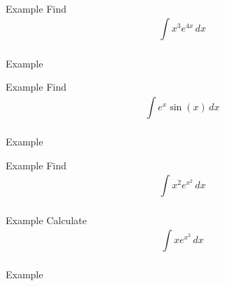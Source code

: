 \documentclass[presentation]{beamer}
\begin{document}
\begin{frame}[label={sec:org5c3f5e0}]{Example}
Find
\[
\int\limits_{}^{} x^3 e^{4x}\,dx \]
\vspace{10in}
\end{frame}

\begin{frame}[label={sec:orge53af18}]{Example}
\end{frame}

\begin{frame}[label={sec:orgb1f928c}]{Example}
Find
\[
\int\limits_{}^{} e^x\sin(x)\,dx\]
\vspace{10in}
\end{frame}

\begin{frame}[label={sec:orga7eacd9}]{Example}
\end{frame}

\begin{frame}[label={sec:org62a9565}]{Example}
Find
\[
\int\limits_{}^{} x^2 e^{x^2}\,dx\]

\vspace{10in}
\end{frame}

\begin{frame}[label={sec:org989d045}]{Example}
Calculate
\[
\int\limits_{}^{} xe^{x^2}\,dx \]
\vspace{10in}
\end{frame}

\begin{frame}[label={sec:org1449380}]{Example}
\end{frame}
\end{document}
